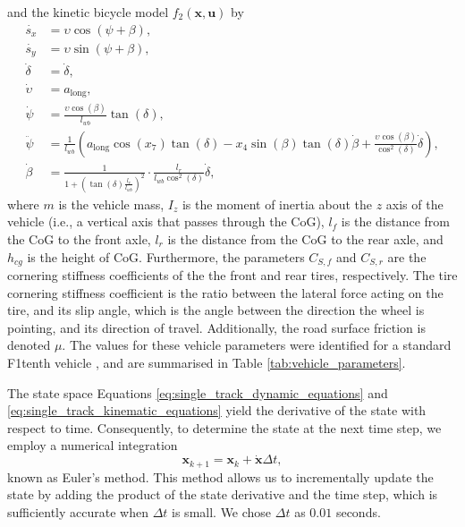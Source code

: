 and the kinetic bicycle model $f_2(\mathbf{x}, \mathbf{u})$ by 
\begin{equation}
\begin{split}
    \dot{s_x} &= \upsilon \cos(\psi + \beta), \\
    \dot{s_y} &= \upsilon \sin(\psi + \beta), \\
    \dot{\delta} &= \dot{\delta}, \\
    \dot{\upsilon} &= a_{\text{long}}, \\
    \dot{\psi} &= \frac{\upsilon \cos(\beta)}{l_{wb}} \tan(\delta), \\
    \ddot{\psi} &= \frac{1}{l_{wb}} (a_{\text{long}} \cos(x_7)\tan(\delta) - x_4\sin(\beta)\tan(\delta)\dot{\beta} + \frac{\upsilon \cos(\beta)}{\cos^2(\delta)} \dot{\delta} ), \\
    \dot{\beta} &= \frac{1}{1+(\tan(\delta)\frac{l_r}{l_{wb}})^2} \cdot \frac{l_r}{l_{wb} \cos^2(\delta)} \dot{\delta},
\label{eq:single_track_kinematic_equations}
\end{split}
\end{equation}
where $m$ is the vehicle mass, $I_z$ is the moment of inertia about the $z$ axis of the vehicle (i.e., a vertical axis that passes through the CoG), $l_f$ is the distance from the CoG to the front axle, $l_r$ is the distance from the CoG to the rear axle, and $h_{cg}$ is the height of CoG.
Furthermore, the parameters $C_{S,f}$ and $C_{S,r}$ are the cornering stiffness coefficients of the the front and rear tires, respectively.
The tire cornering stiffness coefficient is the ratio between the lateral force acting on the tire, and its slip angle, which is the angle between the direction the wheel is pointing, and its direction of travel.
Additionally, the road surface friction is denoted $\mu$.
The values for these vehicle parameters were identified for a standard F1tenth vehicle \cite{f1tenth}, and are summarised in Table \ref{tab:vehicle_parameters}. 





The state space Equations \ref{eq:single_track_dynamic_equations} and \ref{eq:single_track_kinematic_equations} yield the derivative of the state with respect to time. 
Consequently, to determine the state at the next time step, we employ a numerical integration 
\begin{equation}\label{eq:euler}
\mathbf{x}_{k+1} = \mathbf{x}_k + \mathbf{\dot{x}} \Delta t,
\end{equation}
known as Euler's method. 
This method allows us to incrementally update the state by adding the product of the state derivative and the time step, which is sufficiently accurate when $\Delta t$ is small.
We chose $\Delta t$ as $0.01$ seconds.


